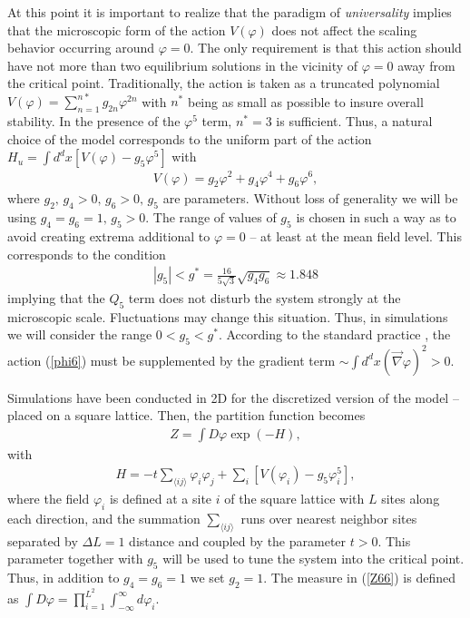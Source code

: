 \documentclass[prb,aps,twocolumn,groupedaddress,floats,showpacs,final]{revtex4}
\def\beq{\begin{eqnarray}}
\def\eeq{\end{eqnarray}}
\begin{document}
  At this point it is important to realize that the paradigm of {\it universality} implies that the microscopic form of the action $V(\varphi)$ does not affect the scaling behavior occurring around $\varphi=0$. The only requirement is that this action should have
 not more than two equilibrium solutions in the vicinity of $\varphi=0$ away from the critical point. Traditionally, the action is taken as a truncated polynomial $V(\varphi)=\sum_{n=1}^{n*} g_{2n} \varphi^{2n}$ with $n^*$ being as small as possible to insure overall stability. In the presence of the $\varphi^5$ term, $n^*=3$ is sufficient.   Thus, a natural choice of the model corresponds to the uniform part of the action $H_u=\int d^dx [V(\varphi) - g_5 \varphi^5]$ with 
\beq
V(\varphi) =g_2 \varphi^2 + g_4 \varphi^4 + g_6 \varphi^6,
\label{phi6}
\eeq 
where $g_2,\, g_4 >0,\, g_6>0, \,g_5$ are parameters. Without loss of generality we will be using $g_4=g_6=1,\, g_5>0$.
The range of values of $g_5$ is chosen in such a way as to avoid creating  extrema additional to $\varphi=0$ -- at least at the mean field level. This corresponds to the condition 
\beq
|g_5| < g^*= \frac{16}{5\sqrt{3}}\sqrt{g_4g_6}\approx 1.848  
\label{g5}
\eeq
 implying that the $Q_5$ term does not disturb the system strongly at the microscopic scale. Fluctuations may change this situation. 
Thus, in simulations we will consider the range $0< g_5 < g^*$. 
According to the standard practice \cite{Landau}, the action (\ref{phi6}) must be supplemented by the gradient term $ \sim \int d^dx  (\vec{\nabla}\varphi)^2 >0$. 

Simulations have been conducted in 2D for the discretized version of the model -- placed on a square lattice.
Then, the partition function becomes
\beq
Z=\int D\varphi \exp(-H),
\label{Z66}
\eeq
with
\beq
H= -t \sum_{\langle ij\rangle} \varphi_i \varphi_j  + \sum_i [V(\varphi_i) - g_5\varphi^5_i],
\label{H66}
\eeq
where the field $\varphi_i$ is defined at a site $i$ of the square lattice with $L$ sites along each direction, and the summation $ \sum_{\langle ij\rangle}$ runs over nearest neighbor sites separated by $\Delta L=1$ distance and coupled by the parameter $t>0$. This parameter together with $g_5$ will be used to tune the system into the critical point. Thus, in addition to $g_4=g_6=1$ we set $g_2=1$. The measure in (\ref{Z66}) is defined as $\int D\varphi = \prod_{i=1}^{L^2} \int_{-\infty}^{\infty} d\varphi_i$.
\end{document}
